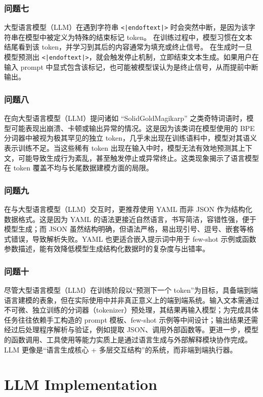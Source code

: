 \documentclass{article}
\begin{document}
\subsubsection{问题七}
大型语言模型（LLM）在遇到字符串 \texttt{<|endoftext|>} 时会突然中断，是因为该字符串在模型中被定义为特殊的结束标记 token。
在训练过程中，模型习惯在文本结尾看到该 token，并学习到其后的内容通常为填充或终止信号。
在生成时一旦模型预测出 \texttt{<|endoftext|>}，就会触发停止机制，立即结束文本生成。如果用户在输入 prompt 中显式包含该标记，也可能被模型误认为是终止信号，从而提前中断输出。

\subsubsection{问题八}
在向大型语言模型（LLM）提问诸如 “SolidGoldMagikarp” 之类奇特词语时，模型可能表现出崩溃、卡顿或输出异常的情况。这是因为该类词在模型使用的 BPE 分词器中被视为极其罕见的独立 token，几乎未出现在训练语料中，模型对其语义表示训练不足。当这些稀有 token 出现在输入中时，模型无法有效地预测其上下文，可能导致生成行为紊乱，甚至触发停止或异常终止。这类现象揭示了语言模型在 token 覆盖不均与长尾数据建模方面的局限。

\subsubsection{问题九}
在与大型语言模型（LLM）交互时，更推荐使用 YAML 而非 JSON 作为结构化数据格式。这是因为 YAML 的语法更接近自然语言，书写简洁，容错性强，便于模型生成；而 JSON 虽然结构明确，但语法严格，易出现引号、逗号、嵌套等格式错误，导致解析失败。YAML 也更适合嵌入提示词中用于 few-shot 示例或函数参数描述，能有效降低模型生成结构化数据时的复杂度与出错率。

\subsubsection{问题十}
尽管大型语言模型（LLM）在训练阶段以“预测下一个 token”为目标，具备端到端语言建模的表象，但在实际使用中并非真正意义上的端到端系统。输入文本需通过不可微、独立训练的分词器（tokenizer）预处理，其结果再输入模型；为完成具体任务往往依赖手工构造的 prompt 模板、few-shot 示例等中间设计；输出结果还需经过后处理程序解析与验证，例如提取 JSON、调用外部函数等。更进一步，模型的函数调用、工具使用等能力实质上是通过语言生成与外部解释模块协作完成。LLM 更像是“语言生成核心 + 多层交互结构”的系统，而非端到端执行器。


\section{LLM Implementation}
\end{document}
